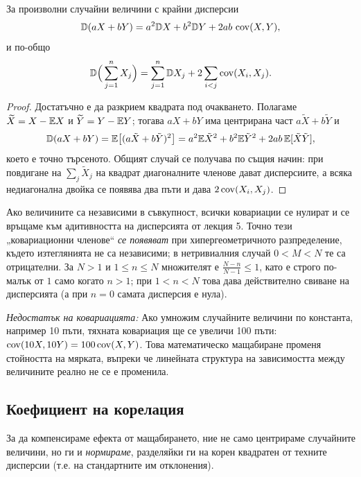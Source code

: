 \begin{prop}\label{prop:var-sum}
За произволни случайни величини с крайни дисперсии
\[
\mathbb{D}(aX + bY) = a^2 \mathbb{D} X + b^2 \mathbb{D} Y + 2ab\,\operatorname{cov}(X,Y),
\]
и по-общо
\[
\mathbb{D}\Big( \sum_{j=1}^{n} X_j \Big)
 = \sum_{j=1}^{n} \mathbb{D} X_j + 2 \sum_{i<j} \operatorname{cov}(X_i, X_j) .
\]
\end{prop}

\begin{proof}
Достатъчно е да разкрием квадрата под очакването. Полагаме $\widetilde{X} = X - \mathbb{E} X$ и
$\widetilde{Y} = Y - \mathbb{E} Y$; тогава $a X + b Y$ има центрирана част $a\tilde X + b\tilde Y$ и
\[
\mathbb{D}(aX+bY) = \mathbb{E}\big[(a\tilde X + b\tilde Y)^2\big]
 = a^2 \mathbb{E} \tilde X^2 + b^2 \mathbb{E} \tilde Y^2 + 2ab\,\mathbb{E}[\tilde X \tilde Y],
\]
което е точно търсеното. Общият случай се получава по същия начин: при повдигане на
$\sum_j \tilde X_j$ на квадрат диагоналните членове дават дисперсиите, а всяка
недиагонална двойка се появява два пъти и дава $2\operatorname{cov}(X_i, X_j)$.
\end{proof}

Ако величините са независими в съвкупност, всички ковариации се нулират и се връщаме към
адитивността на дисперсията от лекция 5. Точно тези „ковариационни членове“ \emph{се появяват}
при хипергеометричното разпределение, където изтеглянията не са независими; в нетривиалния
случай $0<M<N$ те са отрицателни. За $N>1$ и $1\le n\le N$ множителят е
$\frac{N-n}{N-1}\le 1$, като е строго по-малък от $1$ само когато $n>1$; при
$1<n<N$ това дава действително свиване на дисперсията (а при $n=0$ самата
дисперсия е нула).

\emph{Недостатък на ковариацията:} Ако умножим случайните величини по константа, например 10 пъти, тяхната ковариация ще се увеличи 100 пъти: $\operatorname{cov}(10X, 10Y) = 100 \operatorname{cov}(X, Y)$. Това математическо мащабиране променя стойността на мярката, въпреки че линейната структура на зависимостта между величините реално не се е променила.

\subsection{Коефициент на корелация}

За да компенсираме ефекта от мащабирането, ние не само центрираме случайните величини, но ги и \emph{нормираме}, разделяйки ги на корен квадратен от техните дисперсии (т.е. на стандартните им отклонения).

